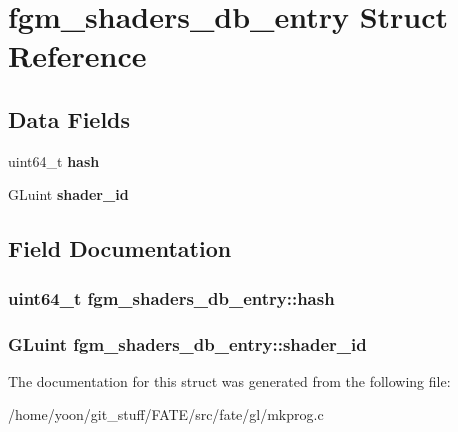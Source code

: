 \hypertarget{structfgm__shaders__db__entry}{\section{fgm\-\_\-shaders\-\_\-db\-\_\-entry Struct Reference}
\label{structfgm__shaders__db__entry}
}
\subsection*{Data Fields}
\begin{DoxyCompactItemize}
\item 
\hypertarget{structfgm__shaders__db__entry_a392682dc98a80edef174e4195c17e0ff}{uint64\-\_\-t {\bfseries hash}}\label{structfgm__shaders__db__entry_a392682dc98a80edef174e4195c17e0ff}

\item 
\hypertarget{structfgm__shaders__db__entry_ac70a89cac77396370620cf1024bc276f}{G\-Luint {\bfseries shader\-\_\-id}}\label{structfgm__shaders__db__entry_ac70a89cac77396370620cf1024bc276f}

\end{DoxyCompactItemize}


\subsection{Field Documentation}
\hypertarget{structfgm__shaders__db__entry_a392682dc98a80edef174e4195c17e0ff}{
\subsubsection[{hash}]{\setlength{\rightskip}{0pt plus 5cm}uint64\-\_\-t fgm\-\_\-shaders\-\_\-db\-\_\-entry\-::hash}}\label{structfgm__shaders__db__entry_a392682dc98a80edef174e4195c17e0ff}
\hypertarget{structfgm__shaders__db__entry_ac70a89cac77396370620cf1024bc276f}{
\subsubsection[{shader\-\_\-id}]{\setlength{\rightskip}{0pt plus 5cm}G\-Luint fgm\-\_\-shaders\-\_\-db\-\_\-entry\-::shader\-\_\-id}}\label{structfgm__shaders__db__entry_ac70a89cac77396370620cf1024bc276f}


The documentation for this struct was generated from the following file\-:\begin{DoxyCompactItemize}
\item 
/home/yoon/git\-\_\-stuff/\-F\-A\-T\-E/src/fate/gl/mkprog.\-c\end{DoxyCompactItemize}

